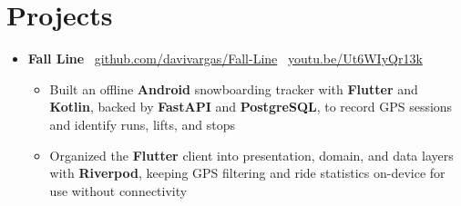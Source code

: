 \documentclass[letterpaper,11pt]{article}
\newcommand{\resumeItem}[1]{
  \item\small{
    {#1 \vspace{-2pt}}
  }
}
\newcommand{\resumeSubHeadingListStart}{\begin{itemize}[leftmargin=0.15in, label={}]}
\newcommand{\resumeSubHeadingListEnd}{\end{itemize}}
\newcommand{\resumeItemListStart}{\begin{itemize}}
\newcommand{\resumeItemListEnd}{\end{itemize}\vspace{-5pt}}
\begin{document}
\section{Projects}
    \resumeSubHeadingListStart
      \item
        \textbf{Fall Line} \textbar\
        \href{https://github.com/davivargas/Fall-Line}{github.com/davivargas/Fall-Line}
        \textbar\
        \href{https://www.youtube.com/watch?v=Ut6WIyQr13k}{youtu.be/Ut6WIyQr13k}
        \vspace{-4pt}
        \resumeItemListStart
          \resumeItem{Built an offline \textbf{Android} snowboarding tracker with \textbf{Flutter} and \textbf{Kotlin}, backed by \textbf{FastAPI} and \textbf{PostgreSQL}, to record GPS sessions and identify runs, lifts, and stops}
          \resumeItem{Organized the \textbf{Flutter} client into presentation, domain, and data layers with \textbf{Riverpod}, keeping GPS filtering and ride statistics on-device for use without connectivity}
      \resumeItemListEnd
    \resumeSubHeadingListEnd
\end{document}

